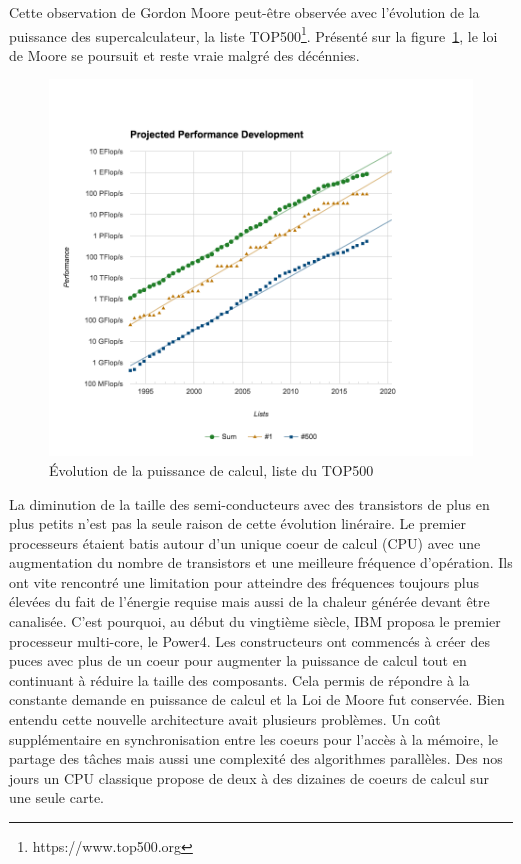 \documentclass[12pt,a4paper]{report}
\begin{document}
Cette observation de Gordon Moore peut-être observée avec l'évolution de la puissance des supercalculateur, la liste TOP500\footnote{https://www.top500.org}.
Présenté sur la figure~\ref{fig:intro_top500}, le loi de Moore se poursuit et reste vraie malgré des décénnies.

\begin{figure}[h]
\centering
\includegraphics[width=.7\linewidth]{../figures/introduction/top500_list_approximation.png}
\caption{\'Evolution de la puissance de calcul, liste du TOP500}
\label{fig:intro_top500}
\end{figure}

La diminution de la taille des semi-conducteurs avec des transistors de plus en plus petits n'est pas la seule raison de cette évolution linéraire. 
Le premier processeurs étaient batis autour d'un unique coeur de calcul (CPU) avec une augmentation du nombre de transistors et une meilleure fréquence d'opération.
Ils ont vite rencontré une limitation pour atteindre des fréquences toujours plus élevées du fait de l'énergie requise mais aussi de la chaleur générée devant être canalisée.
C'est pourquoi, au début du vingtième siècle, IBM proposa le premier processeur multi-core, le Power4.
Les constructeurs ont commencés à créer des puces avec plus de un coeur pour augmenter la puissance de calcul tout en continuant à réduire la taille des composants. 
Cela permis de répondre à la constante demande en puissance de calcul et la Loi de Moore fut conservée. 
Bien entendu cette nouvelle architecture avait plusieurs problèmes. 
Un coût supplémentaire en synchronisation entre les coeurs pour l'accès à la mémoire, le partage des tâches mais aussi une complexité des algorithmes parallèles. 
Des nos jours un CPU classique propose de deux à des dizaines de coeurs de calcul sur une seule carte.\\
\end{document}

